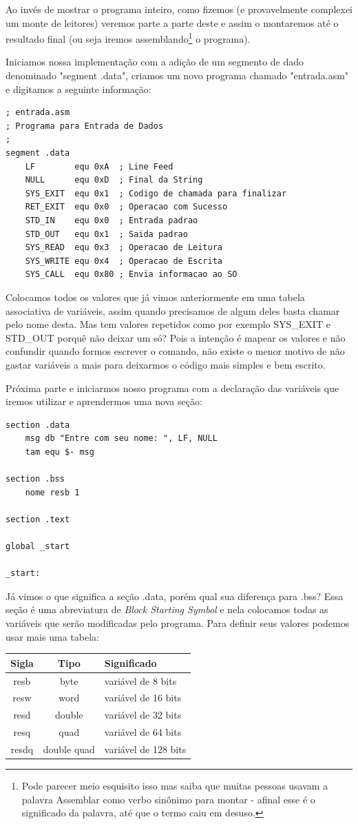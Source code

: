 Ao invés de mostrar o programa inteiro, como fizemos (e provavelmente complexei um monte de leitores) veremos parte a parte deste e assim o montaremos até o resultado final (ou seja iremos assemblando\footnote{Pode parecer meio esquisito isso mas saiba que muitas pessoas usavam a palavra Assemblar como verbo sinônimo para montar - afinal esse é o significado da palavra, até que o termo caiu em desuso.} o programa).

Iniciamos nossa implementação com a adição de um segmento de dado denominado "segment .data", criamos um novo programa chamado "entrada.asm" e digitamos a seguinte informação:
\begin{lstlisting}[]
; entrada.asm	
; Programa para Entrada de Dados
;
segment .data
	LF        equ 0xA  ; Line Feed
	NULL      equ 0xD  ; Final da String
	SYS_EXIT  equ 0x1  ; Codigo de chamada para finalizar
	RET_EXIT  equ 0x0  ; Operacao com Sucesso
	STD_IN    equ 0x0  ; Entrada padrao
	STD_OUT   equ 0x1  ; Saida padrao
	SYS_READ  equ 0x3  ; Operacao de Leitura
	SYS_WRITE equ 0x4  ; Operacao de Escrita
	SYS_CALL  equ 0x80 ; Envia informacao ao SO
\end{lstlisting}

Colocamos todos os valores que já vimos anteriormente em uma tabela associativa de variáveis, assim quando precisamos de algum deles basta chamar pelo nome desta. Mas tem valores repetidos como por exemplo SYS\_EXIT e STD\_OUT porquê não deixar um só? Pois a intenção é mapear os valores e não confundir quando formos escrever o comando, não existe o menor motivo de não gastar variáveis a mais para deixarmos o código mais simples e bem escrito.

Próxima parte e iniciarmos nosso programa com a declaração das variáveis que iremos utilizar e aprendermos uma nova seção:
\begin{lstlisting}[]
section .data
	msg db "Entre com seu nome: ", LF, NULL
	tam equ $- msg

section .bss
	nome resb 1

section .text

global _start

_start:
\end{lstlisting}

Já vimos o que significa a seção .data, porém qual sua diferença para .bss? Essa seção é uma abreviatura de \textit{Block Starting Symbol} e nela colocamos todas as variáveis que serão modificadas pelo programa. Para definir seus valores podemos usar mais uma tabela:
\begin{table}[H]
	\centering 
	\begin{tabular}{c | c | l }
		\textbf{Sigla} & \textbf{Tipo} & \textbf{Significado} \\ \hline
		resb & byte & variável de 8 bits \\
		resw & word & variável de 16 bits \\
		resd & double & variável de 32 bits \\
		resq & quad & variável de 64 bits \\
		resdq & double quad & variável de 128 bits
	\end{tabular}
\end{table}

